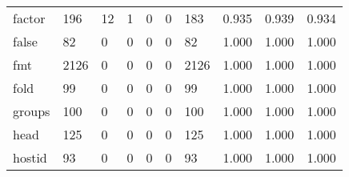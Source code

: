 \begin{longtable}{lp{1.3cm}p{1.3cm}p{1.3cm}p{1.3cm}p{1.3cm}p{1.3cm}p{1.3cm}p{1.3cm}p{1.3cm}}
factor    &                    196 &                                 12 &                                 1 &                                0 &                                 0 &                             183 &                                0.935 &                                  0.939 &                                0.934 \\
false     &                     82 &                                  0 &                                 0 &                                0 &                                 0 &                              82 &                                1.000 &                                  1.000 &                                1.000 \\
fmt       &                   2126 &                                  0 &                                 0 &                                0 &                                 0 &                            2126 &                                1.000 &                                  1.000 &                                1.000 \\
fold      &                     99 &                                  0 &                                 0 &                                0 &                                 0 &                              99 &                                1.000 &                                  1.000 &                                1.000 \\
groups    &                    100 &                                  0 &                                 0 &                                0 &                                 0 &                             100 &                                1.000 &                                  1.000 &                                1.000 \\
head      &                    125 &                                  0 &                                 0 &                                0 &                                 0 &                             125 &                                1.000 &                                  1.000 &                                1.000 \\
hostid    &                     93 &                                  0 &                                 0 &                                0 &                                 0 &                              93 &                                1.000 &                                  1.000 &                                1.000 \\

\end{longtable}
